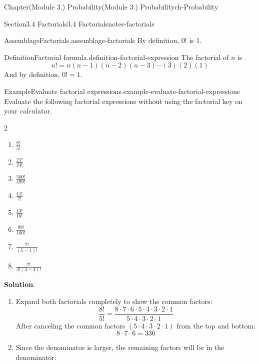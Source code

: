 \documentclass[oneside,10pt,]{book}
\newcommand{\blocktitlefont}{\relax}
\begin{document}
\begin{chapterptx}{Chapter}{(Module 3.) Probability}{}{(Module 3.) Probability}{}{}{ch-Probability}
\begin{sectionptx}{Section}{3.4 Factorials}{}{3.4 Factorials}{}{}{notes-factorials}
\begin{assemblage}{Assemblage}{Factorials.}{assemblage-factorials}
By definition, \(0!\) is 1.%
\end{assemblage}
\begin{definition}{Definition}{Factorial formula.}{definition-factorial-expression}%
The factorial of \(n\) is%
%
\begin{equation*}
n! = n(n-1)(n-2)(n-3)\cdots(3)(2)(1)
\end{equation*}
And by definition, \(0! = 1\).%
\end{definition}
\begin{example}{Example}{Evaluate factorial expressions.}{example-evaluate-factorial-expressions}%
Evaluate the following factorial expressions without using the factorial key on your calculator.%
%
\begin{multicols}{2}
\begin{enumerate}
\item{}\(\displaystyle \frac{8!}{5!}\)%
\item{}\(\displaystyle \frac{21!}{24!}\)%
\item{}\(\displaystyle \frac{500!}{499!}\)%
\item{}\(\displaystyle \frac{11!}{7!}\)%
\item{}\(\displaystyle \frac{13!}{16!}\)%
\item{}\(\displaystyle \frac{99!}{100!}\)%
\item{}\(\displaystyle \frac{7!}{(5-1)!}\)%
\item{}\(\displaystyle \frac{7!}{3!(4-4)!}\)%
\end{enumerate}
\end{multicols}
\par\smallskip%
\noindent\textbf{\blocktitlefont Solution}.\hypertarget{example-evaluate-factorial-expressions-3}{}\quad{}%
\begin{enumerate}
\item{}Expand both factorials completely to show the common factors:%
\begin{equation*}
\frac{8!}{5!} = \frac{8 \cdot 7 \cdot 6 \cdot 5 \cdot 4 \cdot 3 \cdot 2 \cdot 1}{5 \cdot 4 \cdot 3 \cdot 2 \cdot 1}
\end{equation*}
After canceling the common factors \((5 \cdot 4 \cdot 3 \cdot 2 \cdot 1)\) from the top and bottom:%
\begin{equation*}
8 \cdot 7 \cdot 6 = 336
\end{equation*}
%
\item{}Since the denominator is larger, the remaining factors will be in the denominator:%
\begin{equation*}

\end{equation*}
\end{enumerate}
\end{example}
\end{sectionptx}
\end{chapterptx}
\end{document}
